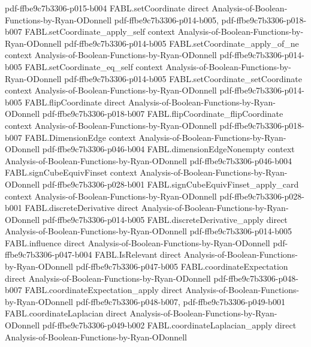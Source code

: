 \begin{theorem}
  {pdf-ffbe9c7b3306-p015-b004}
\proofstep
  {FABL.setCoordinate}
  {direct}
  {Analysis-of-Boolean-Functions-by-Ryan-ODonnell}
  {pdf-ffbe9c7b3306-p014-b005,
    pdf-ffbe9c7b3306-p018-b007}
\proofstep
  {FABL.setCoordinate_apply_self}
  {context}
  {Analysis-of-Boolean-Functions-by-Ryan-ODonnell}
  {pdf-ffbe9c7b3306-p014-b005}
\proofstep
  {FABL.setCoordinate_apply_of_ne}
  {context}
  {Analysis-of-Boolean-Functions-by-Ryan-ODonnell}
  {pdf-ffbe9c7b3306-p014-b005}
\proofstep
  {FABL.setCoordinate_eq_self}
  {context}
  {Analysis-of-Boolean-Functions-by-Ryan-ODonnell}
  {pdf-ffbe9c7b3306-p014-b005}
\proofstep
  {FABL.setCoordinate_setCoordinate}
  {context}
  {Analysis-of-Boolean-Functions-by-Ryan-ODonnell}
  {pdf-ffbe9c7b3306-p014-b005}
\proofstep
  {FABL.flipCoordinate}
  {direct}
  {Analysis-of-Boolean-Functions-by-Ryan-ODonnell}
  {pdf-ffbe9c7b3306-p018-b007}
\proofstep
  {FABL.flipCoordinate_flipCoordinate}
  {context}
  {Analysis-of-Boolean-Functions-by-Ryan-ODonnell}
  {pdf-ffbe9c7b3306-p018-b007}
\proofstep
  {FABL.DimensionEdge}
  {context}
  {Analysis-of-Boolean-Functions-by-Ryan-ODonnell}
  {pdf-ffbe9c7b3306-p046-b004}
\proofstep
  {FABL.dimensionEdgeNonempty}
  {context}
  {Analysis-of-Boolean-Functions-by-Ryan-ODonnell}
  {pdf-ffbe9c7b3306-p046-b004}
\proofstep
  {FABL.signCubeEquivFinset}
  {context}
  {Analysis-of-Boolean-Functions-by-Ryan-ODonnell}
  {pdf-ffbe9c7b3306-p028-b001}
\proofstep
  {FABL.signCubeEquivFinset_apply_card}
  {context}
  {Analysis-of-Boolean-Functions-by-Ryan-ODonnell}
  {pdf-ffbe9c7b3306-p028-b001}
\proofstep
  {FABL.discreteDerivative}
  {direct}
  {Analysis-of-Boolean-Functions-by-Ryan-ODonnell}
  {pdf-ffbe9c7b3306-p014-b005}
\proofstep
  {FABL.discreteDerivative_apply}
  {direct}
  {Analysis-of-Boolean-Functions-by-Ryan-ODonnell}
  {pdf-ffbe9c7b3306-p014-b005}
\proofstep
  {FABL.influence}
  {direct}
  {Analysis-of-Boolean-Functions-by-Ryan-ODonnell}
  {pdf-ffbe9c7b3306-p047-b004}
\proofstep
  {FABL.IsRelevant}
  {direct}
  {Analysis-of-Boolean-Functions-by-Ryan-ODonnell}
  {pdf-ffbe9c7b3306-p047-b005}
\proofstep
  {FABL.coordinateExpectation}
  {direct}
  {Analysis-of-Boolean-Functions-by-Ryan-ODonnell}
  {pdf-ffbe9c7b3306-p048-b007}
\proofstep
  {FABL.coordinateExpectation_apply}
  {direct}
  {Analysis-of-Boolean-Functions-by-Ryan-ODonnell}
  {pdf-ffbe9c7b3306-p048-b007,
    pdf-ffbe9c7b3306-p049-b001}
\proofstep
  {FABL.coordinateLaplacian}
  {direct}
  {Analysis-of-Boolean-Functions-by-Ryan-ODonnell}
  {pdf-ffbe9c7b3306-p049-b002}
\proofstep
  {FABL.coordinateLaplacian_apply}
  {direct}
  {Analysis-of-Boolean-Functions-by-Ryan-ODonnell}

\end{theorem}
